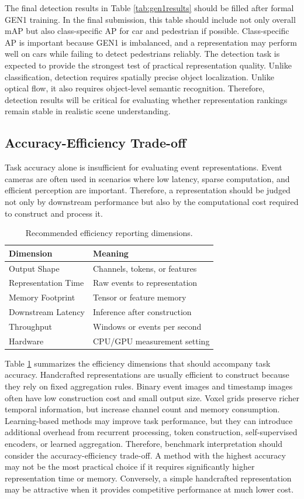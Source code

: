 \documentclass[letterpaper]{article}
\begin{document}
The final detection results in Table \ref{tab:gen1results} should be filled after formal GEN1 training. In the final submission, this table should include not only overall mAP but also class-specific AP for car and pedestrian if possible. Class-specific AP is important because GEN1 is imbalanced, and a representation may perform well on cars while failing to detect pedestrians reliably. The detection task is expected to provide the strongest test of practical representation quality. Unlike classification, detection requires spatially precise object localization. Unlike optical flow, it also requires object-level semantic recognition. Therefore, detection results will be critical for evaluating whether representation rankings remain stable in realistic scene understanding.

\subsection{Accuracy-Efficiency Trade-off}
Task accuracy alone is insufficient for evaluating event representations. Event cameras are often used in scenarios where low latency, sparse computation, and efficient perception are important. Therefore, a representation should be judged not only by downstream performance but also by the computational cost required to construct and process it.

\begin{table}[htbp]
\centering
\begin{tabular}{l|l}
Dimension & Meaning \\
\hline
Output Shape & Channels, tokens, or features \\
Representation Time & Raw events to representation \\
Memory Footprint & Tensor or feature memory \\
Downstream Latency & Inference after construction \\
Throughput & Windows or events per second \\
Hardware & CPU/GPU measurement setting \\
\end{tabular}
\caption{Recommended efficiency reporting dimensions.}
\label{tab:efficiency}
\end{table}

Table \ref{tab:efficiency} summarizes the efficiency dimensions that should accompany task accuracy. Handcrafted representations are usually efficient to construct because they rely on fixed aggregation rules. Binary event images and timestamp images often have low construction cost and small output size. Voxel grids preserve richer temporal information, but increase channel count and memory consumption. Learning-based methods may improve task performance, but they can introduce additional overhead from recurrent processing, token construction, self-supervised encoders, or learned aggregation. Therefore, benchmark interpretation should consider the accuracy-efficiency trade-off. A method with the highest accuracy may not be the most practical choice if it requires significantly higher representation time or memory. Conversely, a simple handcrafted representation may be attractive when it provides competitive performance at much lower cost.
\end{document}
